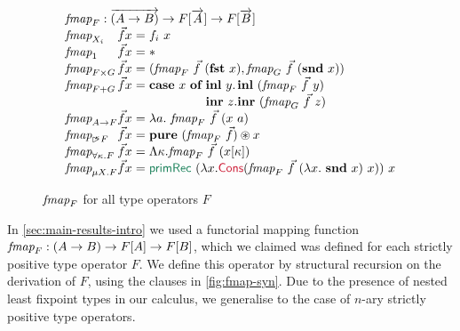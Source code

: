 \begin{figure}[t]
  \centering
\begin{displaymath}
  \begin{array}{l@{}c@{}c@{}c@{}c@{}l}
    \ident{fmap}_F : \overrightarrow{(A \to B)} \to F[\overrightarrow{A}] \to F[\overrightarrow{B}] \\
    \begin{array}{@{}l@{}l@{}l@{\hspace{0.3em}}c@{\hspace{0.3em}}l}
    \ident{fmap}_{X_i}&\vec{f}&x & = & f_i~x \\
    \ident{fmap}_1    &\vec{f}&x & = & * \\
    \ident{fmap}_{F \times G}&\vec{f}&x & = & (\ident{fmap}_F~\vec{f}~(\kw{fst}~x), \ident{fmap}_G~\vec{f}~(\kw{snd}~x)) \\
    \ident{fmap}_{F + G}&\vec{f}&x & = & \kw{case}~x~\kw{of}~
    \begin{array}[t]{@{}l@{}l}
      \kw{inl}~y. & \kw{inl}~(\ident{fmap}_F~\vec{f}~y) \\
      \kw{inr}~z. & \kw{inr}~(\ident{fmap}_G~\vec{f}~z)
    \end{array}\\
    \ident{fmap}_{A\to F}&\vec{f}&x&=&\lambda a.~\ident{fmap}_F~\vec{f}~(x~a) \\
    \ident{fmap}_{\delay\kappa F}&\vec{f}&x&=&\kw{pure}~(\ident{fmap}_F~\vec{f}) \circledast x \\
    \ident{fmap}_{\forall\kappa.F}&\vec{f}&x&=&\Lambda \kappa. \ident{fmap}_F~\vec{f}~(x[\kappa]) \\
    \ident{fmap}_{\mu X. F}&\vec{f}&x&=&\elim{primRec}~(\lambda x. \cons{Cons}(\ident{fmap}_F~\vec{f}~(\lambda x.~\kw{snd}~x)~x))~x      
    \end{array}
  \end{array}
\end{displaymath}  
  \caption{$\textit{fmap}_F$ for all type operators $F$}
  \label{fig:fmap-syn}
\end{figure}

In \autoref{sec:main-results-intro} we used a functorial mapping
function $\textit{fmap}_F : (A \to B) \to F[A] \to F[B]$, which we
claimed was defined for each strictly positive type operator $F$. We
define this operator by structural recursion on the derivation of $F$,
using the clauses in \autoref{fig:fmap-syn}. Due to the presence of
nested least fixpoint types in our calculus, we generalise to the case
of $n$-ary strictly positive type operators.

